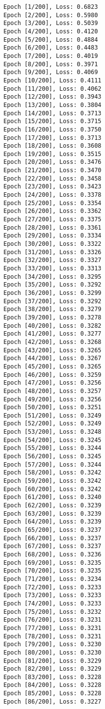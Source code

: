 \documentclass[11pt]{article}
\begin{document}
    \begin{Verbatim}[commandchars=\\\{\}]
Epoch [1/200], Loss: 0.6823
Epoch [2/200], Loss: 0.5980
Epoch [3/200], Loss: 0.5039
Epoch [4/200], Loss: 0.4120
Epoch [5/200], Loss: 0.4884
Epoch [6/200], Loss: 0.4483
Epoch [7/200], Loss: 0.4019
Epoch [8/200], Loss: 0.3971
Epoch [9/200], Loss: 0.4069
Epoch [10/200], Loss: 0.4111
Epoch [11/200], Loss: 0.4062
Epoch [12/200], Loss: 0.3943
Epoch [13/200], Loss: 0.3804
Epoch [14/200], Loss: 0.3713
Epoch [15/200], Loss: 0.3715
Epoch [16/200], Loss: 0.3750
Epoch [17/200], Loss: 0.3713
Epoch [18/200], Loss: 0.3608
Epoch [19/200], Loss: 0.3515
Epoch [20/200], Loss: 0.3476
Epoch [21/200], Loss: 0.3470
Epoch [22/200], Loss: 0.3458
Epoch [23/200], Loss: 0.3423
Epoch [24/200], Loss: 0.3378
Epoch [25/200], Loss: 0.3354
Epoch [26/200], Loss: 0.3362
Epoch [27/200], Loss: 0.3375
Epoch [28/200], Loss: 0.3361
Epoch [29/200], Loss: 0.3334
Epoch [30/200], Loss: 0.3322
Epoch [31/200], Loss: 0.3326
Epoch [32/200], Loss: 0.3327
Epoch [33/200], Loss: 0.3313
Epoch [34/200], Loss: 0.3295
Epoch [35/200], Loss: 0.3292
Epoch [36/200], Loss: 0.3299
Epoch [37/200], Loss: 0.3292
Epoch [38/200], Loss: 0.3279
Epoch [39/200], Loss: 0.3278
Epoch [40/200], Loss: 0.3282
Epoch [41/200], Loss: 0.3277
Epoch [42/200], Loss: 0.3268
Epoch [43/200], Loss: 0.3265
Epoch [44/200], Loss: 0.3267
Epoch [45/200], Loss: 0.3265
Epoch [46/200], Loss: 0.3259
Epoch [47/200], Loss: 0.3256
Epoch [48/200], Loss: 0.3257
Epoch [49/200], Loss: 0.3256
Epoch [50/200], Loss: 0.3251
Epoch [51/200], Loss: 0.3249
Epoch [52/200], Loss: 0.3249
Epoch [53/200], Loss: 0.3248
Epoch [54/200], Loss: 0.3245
Epoch [55/200], Loss: 0.3244
Epoch [56/200], Loss: 0.3245
Epoch [57/200], Loss: 0.3244
Epoch [58/200], Loss: 0.3242
Epoch [59/200], Loss: 0.3242
Epoch [60/200], Loss: 0.3242
Epoch [61/200], Loss: 0.3240
Epoch [62/200], Loss: 0.3239
Epoch [63/200], Loss: 0.3239
Epoch [64/200], Loss: 0.3239
Epoch [65/200], Loss: 0.3237
Epoch [66/200], Loss: 0.3237
Epoch [67/200], Loss: 0.3237
Epoch [68/200], Loss: 0.3236
Epoch [69/200], Loss: 0.3235
Epoch [70/200], Loss: 0.3235
Epoch [71/200], Loss: 0.3234
Epoch [72/200], Loss: 0.3233
Epoch [73/200], Loss: 0.3233
Epoch [74/200], Loss: 0.3233
Epoch [75/200], Loss: 0.3232
Epoch [76/200], Loss: 0.3231
Epoch [77/200], Loss: 0.3231
Epoch [78/200], Loss: 0.3231
Epoch [79/200], Loss: 0.3230
Epoch [80/200], Loss: 0.3230
Epoch [81/200], Loss: 0.3229
Epoch [82/200], Loss: 0.3229
Epoch [83/200], Loss: 0.3228
Epoch [84/200], Loss: 0.3228
Epoch [85/200], Loss: 0.3228
Epoch [86/200], Loss: 0.3227

\end{Verbatim}
\end{document}
